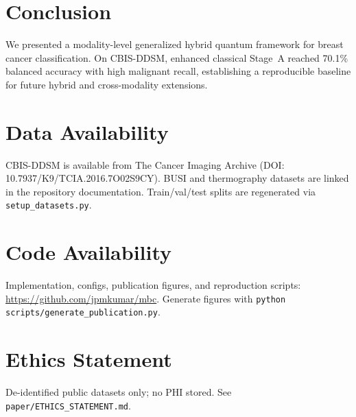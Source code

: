\documentclass[journal]{IEEEtran}
\begin{document}
\section{Conclusion}
We presented a modality-level generalized hybrid quantum framework for breast cancer classification. On CBIS-DDSM, enhanced classical Stage~A reached 70.1\% balanced accuracy with high malignant recall, establishing a reproducible baseline for future hybrid and cross-modality extensions.

\section*{Data Availability}
CBIS-DDSM is available from The Cancer Imaging Archive (DOI: 10.7937/K9/TCIA.2016.7O02S9CY). BUSI and thermography datasets are linked in the repository documentation. Train/val/test splits are regenerated via \texttt{setup\_datasets.py}.

\section*{Code Availability}
Implementation, configs, publication figures, and reproduction scripts: \url{https://github.com/jpmkumar/mbc}. Generate figures with \texttt{python scripts/generate\_publication.py}.

\section*{Ethics Statement}
De-identified public datasets only; no PHI stored. See \texttt{paper/ETHICS\_STATEMENT.md}.



\end{document}
